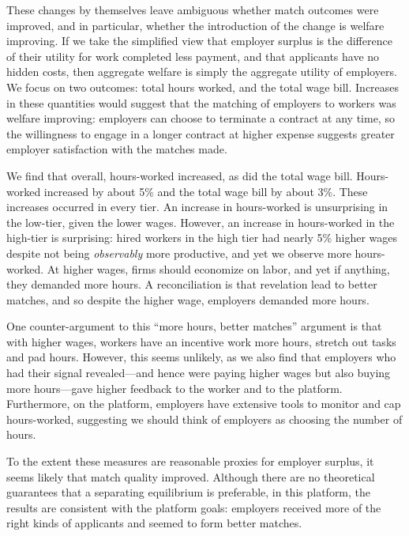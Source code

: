 \begin{enumerate}
These changes by themselves leave ambiguous whether match outcomes were improved, and in particular, whether the introduction of the change is welfare improving.  
If we take the simplified view that employer surplus is the difference of their utility for work completed less payment, and that applicants have no hidden costs, then aggregate welfare is simply the aggregate utility of employers.
We focus on two outcomes: total hours worked, and the total wage bill.
Increases in these quantities would suggest that the matching of employers to workers was welfare improving: employers can choose to terminate a contract at any time, so the willingness to engage in a longer contract at higher expense suggests greater employer satisfaction with the matches made.
 
We find that overall, hours-worked increased, as did the total wage bill.
Hours-worked increased by about 5\% and the total wage bill by about 3\%.
These increases occurred in every tier. 
An increase in hours-worked is unsurprising in the low-tier, given the lower wages. 
However, an increase in hours-worked in the high-tier is surprising: 
hired workers in the high tier had nearly 5\% higher wages despite not being \emph{observably} more productive, and yet we observe more hours-worked.
At higher wages, firms should economize on labor, and yet if anything, they demanded more hours.
A reconciliation is that revelation lead to better matches, and so despite the higher wage, employers demanded more hours.

One counter-argument to this ``more hours, better matches'' argument is that with higher wages, workers have an incentive work more hours, stretch out tasks and pad hours. 
However, this seems unlikely, as we also find that employers who had their signal revealed---and hence were paying higher wages but also buying more hours---gave higher feedback to the worker and to the platform.
Furthermore, on the platform, employers have extensive tools to monitor and cap hours-worked, suggesting we should think of employers as choosing the number of hours. 

To the extent these measures are reasonable proxies for employer surplus, it seems likely that match quality improved. 
Although there are no theoretical guarantees that a separating equilibrium is preferable, in this platform, the results are consistent with the platform goals:
employers received more of the right kinds of applicants and seemed to form better matches. 
\end{enumerate}

